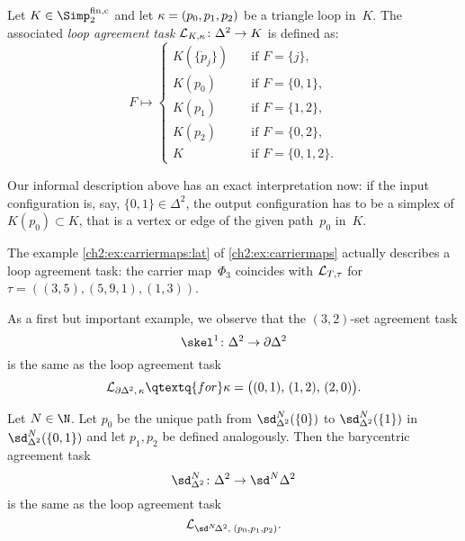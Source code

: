 \begin{thDef}
    Let $K\in\finSimp$ and let $\kappa = (p_0,p_1,p_2)$ be a triangle loop in~$K$. The
    associated \emph{loop agreement task $\mathcal{L}_{K,\kappa}\colon\Delta^2 \to K$}
    is defined as:
    \[
        F \mapsto \begin{cases}
            K(\{\dot{p}_j\}) &\quad \text{if } F = \{j\},   \\
            K(p_0)           &\quad \text{if } F = \{0,1\}, \\
            K(p_1)           &\quad \text{if } F = \{1,2\}, \\
            K(p_2)           &\quad \text{if } F = \{0,2\}, \\
            K             &\quad \text{if } F = \{0,1,2\}
        . \end{cases}
    \]
\end{thDef}

Our informal description above has an exact interpretation now: if the input
configuration is, say, $\{0,1\}\in\Delta^2$, the output configuration has to
be a simplex of $K(p_0)\subset K$, that is a vertex or edge of the given
path~$p_0$ in~$K$.

\begin{thExample}
    The example \ref{ch2:ex:carriermaps:lat} of \cref{ch2:ex:carriermaps}
    actually describes a loop agreement task: the carrier map~$\Phi_3$
    coincides with $\mathcal{L}_{T,\tau}$ for $\tau = ((3,5),(5,9,1),(1,3))$.
\end{thExample}

\pagebreak[2]
\begin{thExample}
    \label{ch3:32setagreement}
    As a first but important example, we observe that the
    $(3,2)$-set agreement task 
    \[ \skel^1\colon\Delta^2\to\partial\Delta^2 \]
    is the same as the loop agreement task
    \[ \Loop{\partial\Delta^2,\,\kappa}
        \qtextq{for}
        \kappa = \bigl( (0,1),\, (1,2),\, (2,0) \bigr)
    . \]
\end{thExample}

\begin{thExample}
    \label{ch3:2dimbaryagreement}
    Let $N\in\N$. Let $p_0$ be the unique path from $\sd_{\Delta^2}^N(\{0\})$
    to $\sd_{\Delta^2}^N(\{1\})$ in $\sd_{\Delta^2}^N(\{0,1\})$ and let
    $p_1,p_2$ be defined analogously. Then the barycentric agreement task
    \[ \sd_{\Delta^2}^N\colon \Delta^2 \to \sd^N \Delta^2 \]
    is the same as the loop agreement task
    \[ \Loop{\sd^N\!\Delta^2, \; (p_0,p_1,p_2)}  . \]
\end{thExample}

